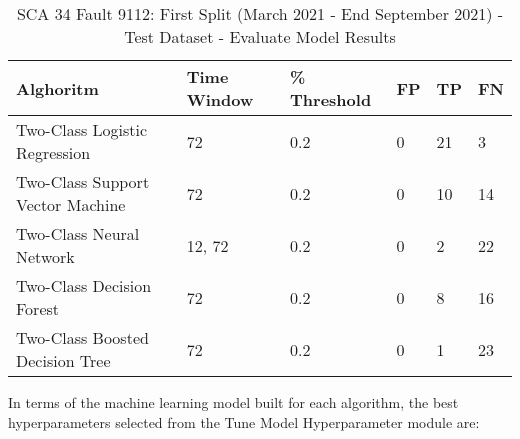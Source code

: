 \begin{table}[!ht]
    \centering
    \begin{tabular}{|l|l|l|l|l|l|}
    \hline
        Alghoritm & Time Window & \% Threshold & FP & TP & FN \\ \hline
        Two-Class Logistic Regression & 72 & 0.2 & 0 & 21 & 3 \\ \hline
        Two-Class Support Vector Machine & 72 & 0.2 & 0 & 10 & 14 \\ \hline
        Two-Class Neural Network & 12, 72 & 0.2 & 0 & 2 & 22 \\ \hline
        Two-Class Decision Forest & 72 & 0.2 & 0 & 8 & 16 \\ \hline
        Two-Class Boosted Decision Tree & 72 & 0.2 & 0 & 1 & 23 \\ \hline
    \end{tabular}
    \caption{SCA 34 Fault 9112: First Split (March 2021 - End September 2021) - Test Dataset - Evaluate Model Results}
    \label{9112_SCA34_1st}
\end{table}

In terms of the machine learning model built for each algorithm, the best hyperparameters selected from the Tune Model Hyperparameter module are:

